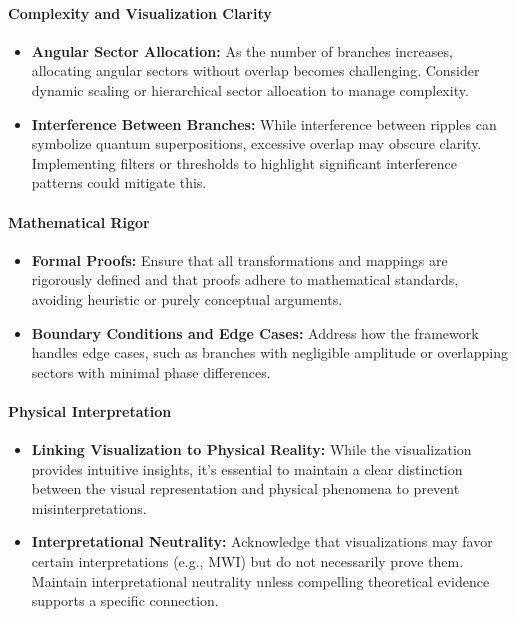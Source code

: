 \documentclass[12pt]{article}
\begin{document}
\paragraph{Complexity and Visualization Clarity}
\begin{itemize}
    \item \textbf{Angular Sector Allocation:} As the number of branches increases, allocating angular sectors without overlap becomes challenging. Consider dynamic scaling or hierarchical sector allocation to manage complexity.
    
    \item \textbf{Interference Between Branches:} While interference between ripples can symbolize quantum superpositions, excessive overlap may obscure clarity. Implementing filters or thresholds to highlight significant interference patterns could mitigate this.
\end{itemize}

\paragraph{Mathematical Rigor}
\begin{itemize}
    \item \textbf{Formal Proofs:} Ensure that all transformations and mappings are rigorously defined and that proofs adhere to mathematical standards, avoiding heuristic or purely conceptual arguments.
    
    \item \textbf{Boundary Conditions and Edge Cases:} Address how the framework handles edge cases, such as branches with negligible amplitude or overlapping sectors with minimal phase differences.
\end{itemize}

\paragraph{Physical Interpretation}
\begin{itemize}
    \item \textbf{Linking Visualization to Physical Reality:} While the visualization provides intuitive insights, it’s essential to maintain a clear distinction between the visual representation and physical phenomena to prevent misinterpretations.
    
    \item \textbf{Interpretational Neutrality:} Acknowledge that visualizations may favor certain interpretations (e.g., MWI) but do not necessarily prove them. Maintain interpretational neutrality unless compelling theoretical evidence supports a specific connection.
\end{itemize}
\end{document}
